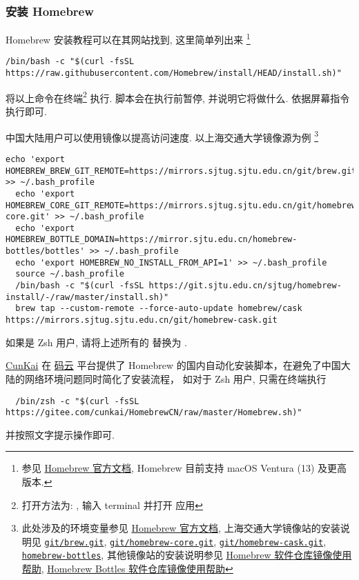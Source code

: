 \subsubsection{安装 Homebrew}

Homebrew 安装教程可以在其网站找到,
这里简单列出来%
\footnote{参见 \href{https://docs.brew.sh/Installation\#git-remote-mirroring}{Homebrew 官方文档}, Homebrew 目前支持 macOS Ventura (13) 及更高版本.}
\begin{lstlisting}[deleteemph = bash]
  /bin/bash -c "$(curl -fsSL https://raw.githubusercontent.com/Homebrew/install/HEAD/install.sh)"
\end{lstlisting}
将以上命令在\textsf{终端}\footnote{%
  打开方法为: \keys{\cmdmac + \SPACE}, 输入 \textsf{terminal} 并打开  应用}%
执行.
脚本会在执行前暂停, 并说明它将做什么. 依据屏幕指令执行即可.

中国大陆用户可以使用镜像以提高访问速度.
以上海交通大学镜像源为例%
\footnote{此处涉及的环境变量参见 \href{https://docs.brew.sh/Manpage\#environment}{Homebrew 官方文档},
上海交通大学镜像站的安装说明见
\href{https://mirrors.sjtug.sjtu.edu.cn/docs/git/brew.git}{\texttt{git/brew.git}},
\href{https://mirrors.sjtug.sjtu.edu.cn/docs/git/homebrew-core.git}{\texttt{git/homebrew-core.git}},
\href{https://mirrors.sjtug.sjtu.edu.cn/docs/git/homebrew-cask.git}{\texttt{git/homebrew-cask.git}},
\href{https://mirrors.sjtug.sjtu.edu.cn/docs/homebrew-bottles}{\texttt{homebrew-bottles}},
其他镜像站的安装说明参见
\href{https://help.mirrors.cernet.edu.cn/homebrew/}{Homebrew 软件仓库镜像使用帮助},
\href{https://help.mirrors.cernet.edu.cn/homebrew-bottles/}{Homebrew Bottles 软件仓库镜像使用帮助}}
\begin{lstlisting}[deleteemph = bash]
  echo 'export HOMEBREW_BREW_GIT_REMOTE=https://mirrors.sjtug.sjtu.edu.cn/git/brew.git' >> ~/.bash_profile
  echo 'export HOMEBREW_CORE_GIT_REMOTE=https://mirrors.sjtug.sjtu.edu.cn/git/homebrew-core.git' >> ~/.bash_profile
  echo 'export HOMEBREW_BOTTLE_DOMAIN=https://mirror.sjtu.edu.cn/homebrew-bottles/bottles' >> ~/.bash_profile
  echo 'export HOMEBREW_NO_INSTALL_FROM_API=1' >> ~/.bash_profile
  source ~/.bash_profile
  /bin/bash -c "$(curl -fsSL https://git.sjtu.edu.cn/sjtug/homebrew-install/-/raw/master/install.sh)"
  brew tap --custom-remote --force-auto-update homebrew/cask https://mirrors.sjtug.sjtu.edu.cn/git/homebrew-cask.git
\end{lstlisting}
如果是 Zsh 用户, 请将上述所有的  替换为 .

\href{https://gitee.com/cunkai}{CunKai} 在%
\href{https://gitee.com/cunkai/HomebrewCN}{码云}%
平台提供了 Homebrew 的国内自动化安装脚本，在避免了中国大陆的网络环境问题同时简化了安装流程，
如对于 Zsh 用户, 只需在终端执行
\begin{lstlisting}
  /bin/zsh -c "$(curl -fsSL https://gitee.com/cunkai/HomebrewCN/raw/master/Homebrew.sh)"
\end{lstlisting}
并按照文字提示操作即可.

